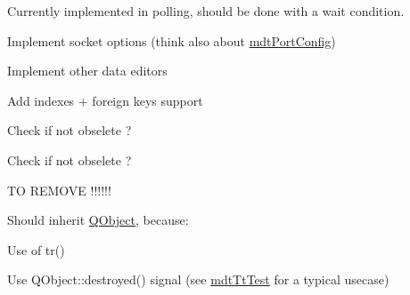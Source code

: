 \begin{DoxyRefList}
\item[\label{todo__todo000036}%
\hypertarget{todo__todo000036}{}%
Member \hyperlink{classmdt_port_thread_helper_aed853f4cedc143c62e7dad5e38ff4b8c}{mdt\-Port\-Thread\-Helper\-:\-:get\-New\-Frame\-Read} ()]Currently implemented in polling, should be done with a wait condition. 
\item[\label{todo__todo000037}%
\hypertarget{todo__todo000037}{}%
Member \hyperlink{classmdt_port_thread_helper_socket_aa77afb8d26e4863bd437e0d59efae7a7}{mdt\-Port\-Thread\-Helper\-Socket\-:\-:mdt\-Port\-Thread\-Helper\-Socket} (\hyperlink{class_q_object}{Q\-Object} $\ast$parent=0)]Implement socket options (think also about \hyperlink{classmdt_port_config}{mdt\-Port\-Config})  
\item[\label{todo__todo000006}%
\hypertarget{todo__todo000006}{}%
Class \hyperlink{classmdt_sql_field_handler_label}{mdt\-Sql\-Field\-Handler\-Label} ]Implement other data editors  
\item[\label{todo__todo000007}%
\hypertarget{todo__todo000007}{}%
Member \hyperlink{classmdt_sql_schema_table_a2cea444ccb26b0802fb230db5460e167}{mdt\-Sql\-Schema\-Table\-:\-:setup\-From\-Table} (const Q\-String \&name, Q\-Sql\-Database db)]Add indexes + foreign keys support  
\item[\label{todo__todo000086}%
\hypertarget{todo__todo000086}{}%
Class \hyperlink{classmdt_sql_table_model}{mdt\-Sql\-Table\-Model} ]Check if not obselete ?  
\item[\label{todo__todo000085}%
\hypertarget{todo__todo000085}{}%
Member \hyperlink{classmdt_sql_table_model_ad423c1b0c74ecbbb575637b028c2574b}{mdt\-Sql\-Table\-Model\-:\-:mdt\-Sql\-Table\-Model} (\hyperlink{class_q_object}{Q\-Object} $\ast$parent=0, Q\-Sql\-Database db=Q\-Sql\-Database())]Check if not obselete ?  
\item[\label{todo__todo000008}%
\hypertarget{todo__todo000008}{}%
Member \hyperlink{classmdt_sql_table_widget_a188d79ad6acb3e3a7984e1bbeee09798}{mdt\-Sql\-Table\-Widget\-:\-:model} ()]T\-O R\-E\-M\-O\-V\-E !!!!!!  
\item[\label{todo__todo000059}%
\hypertarget{todo__todo000059}{}%
Class \hyperlink{classmdt_tt_base}{mdt\-Tt\-Base} ]Should inherit \hyperlink{class_q_object}{Q\-Object}, because\-:
\begin{DoxyItemize}
\item Use of tr()
\item Use Q\-Object\-::destroyed() signal (see \hyperlink{classmdt_tt_test}{mdt\-Tt\-Test} for a typical usecase)  
\end{DoxyItemize}

\end{DoxyRefList}
